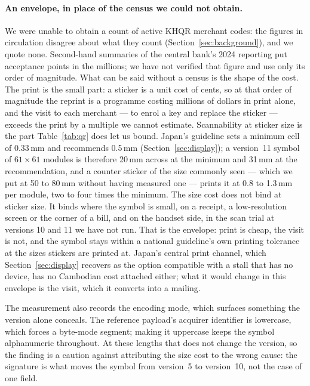 \documentclass[10pt,a4paper,twocolumn]{article}
\begin{document}
\paragraph{An envelope, in place of the census we could not obtain.} We were
unable to obtain a count of active KHQR merchant codes: the figures in
circulation disagree about what they count (Section~\ref{sec:background}), and
we quote none. Second-hand summaries of the central bank's 2024 reporting put
acceptance points in the millions; we have not verified that figure and use
only its order of magnitude. What can be said without a census is the shape of
the cost. The print is the small part: a sticker is a unit cost of cents, so at
that order of magnitude the reprint is a programme costing millions of dollars
in print alone, and the visit to each merchant --- to enrol a key and replace
the sticker --- exceeds the print by a multiple we cannot estimate.
Scannability at sticker size is the part Table~\ref{tab:qr} does let us bound.
Japan's guideline sets a minimum cell of 0.33\,mm and recommends 0.5\,mm
(Section~\ref{sec:display}); a version~11 symbol of $61\times61$ modules is
therefore 20\,mm across at the minimum and 31\,mm at the recommendation, and a
counter sticker of the size commonly seen --- which we put at 50 to 80\,mm
without having measured one --- prints it at 0.8 to 1.3\,mm per module, two to
four times the minimum. The size cost does not bind at sticker size. It binds
where the symbol is small, on a receipt, a low-resolution screen or the corner
of a bill, and on the handset side, in the scan trial at versions 10 and 11 we
have not run. That is the envelope: print is cheap, the visit is not, and the
symbol stays within a national guideline's own printing tolerance at the sizes
stickers are printed at. Japan's central print channel, which
Section~\ref{sec:display} recovers as the option compatible with a stall that
has no device, has no Cambodian cost attached either; what it would change in
this envelope is the visit, which it converts into a mailing.

The measurement also records the encoding mode, which surfaces something the
version alone conceals. The reference payload's acquirer identifier is
lowercase, which forces a byte-mode segment; making it uppercase keeps the
symbol alphanumeric throughout. At these lengths that does not change the
version, so the finding is a caution against attributing the size cost to the
wrong cause: the signature is what moves the symbol from version~5 to
version~10, not the case of one field.
\end{document}
